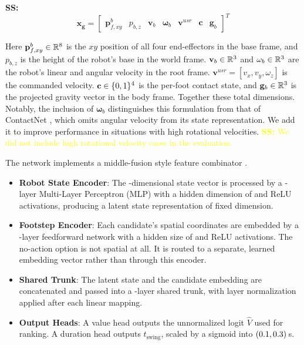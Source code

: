 {\color{red}
\noindent\textbf{SS:}
\begin{equation}
  \mathbf{x_g} =
  \begin{bmatrix}
    \mathbf p_{f,xy}^{b} &
    p_{b,z} &
    \mathbf v_b &
    \mathbf \omega_b &
    \mathbf v^{usr} &
    \mathbf c &
    \mathbf g_b
  \end{bmatrix}^T
  \label{eq:gaitnet-x}
\end{equation}

Here $\mathbf p_{f,xy}^{b} \in \mathbb{R}^{8}$ is the
$xy$ position of all four end-effectors in the base frame, and
$p_{b,z}$ is the height of the robot's base in the world frame.
$\mathbf v_b \in \mathbb{R}^{3}$ and
$\mathbf \omega_b \in \mathbb{R}^{3}$ are the robot's
linear and angular velocity in the root frame.
$\mathbf v^{usr} = [v_x, v_y, \omega_z]$ is the commanded velocity.
$\mathbf c \in \{0,1\}^{4}$ is the per-foot contact
state, and $\mathbf g_b \in \mathbb{R}^{3}$ is the
projected gravity vector in the body frame.
Together these total \corlStateDim{} dimensions. Notably, the
inclusion of $\mathbf \omega_b$ distinguishes this formulation from
that of ContactNet \cite{bratta_contactnet_2024}, which omits angular
velocity from its state representation. We add it to improve
performance in situations with high rotational velocities.
\textcolor{yellow}{\textbf{SS:} We did not include high rotational
velocity cases in the evaluation.}
}

The network implements a middle-fusion style feature combinator
\cite{feng2021deep}.
\begin{itemize}
  \item \textbf{Robot State Encoder}: The \corlStateDim-dimensional
    state vector is processed by a
    \numberstringnum{\corlStateEncoderLayers}-layer Multi-Layer
    Perceptron (MLP) with a hidden dimension of
    \corlStateEncoderHidden{} and ReLU activations, producing a
    latent state representation of fixed dimension.
  \item \textbf{Footstep Encoder}: Each candidate's spatial
    coordinates are embedded by a
    \numberstringnum{\corlFootstepEncoderLayers}-layer feedforward
    network with a hidden size of \corlFootstepEncoderHidden{} and
    ReLU activations. The no-action option is not spatial at all. It
    is routed to a separate, learned embedding vector rather than
    through this encoder.
  \item \textbf{Shared Trunk}: The latent state and the candidate
    embedding are concatenated and passed into a
    \numberstringnum{\corlTrunkLayers}-layer shared trunk, with layer
    normalization applied after each linear mapping.
  \item \textbf{Output Heads}: A value head outputs the unnormalized
    logit $\hat{V}$ used for ranking. A duration head outputs
    $t_{\text{swing}}$, scaled by a sigmoid into
    $(0.1, 0.3)$\,s.
\end{itemize}

